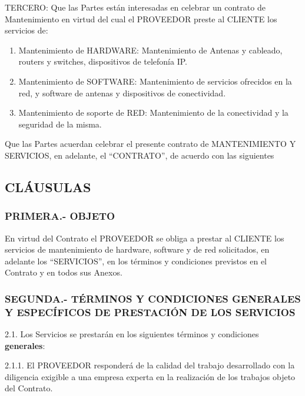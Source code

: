 \documentclass['12pt',spanish,a4paper,]{article}
\begin{document}
TERCERO: Que las Partes están interesadas en celebrar un contrato de
Mantenimiento en virtud del cual el PROVEEDOR preste al CLIENTE los
servicios de:

\begin{enumerate}
\def\labelenumi{\alph{enumi})}
\itemsep1pt\parskip0pt
\item
  Mantenimiento de HARDWARE: Mantenimiento de Antenas y cableado,
  routers y switches, dispositivos de telefonía IP.
\item
  Mantenimiento de SOFTWARE: Mantenimiento de servicios ofrecidos en la
  red, y software de antenas y dispositivos de conectividad.
\item
  Mantenimiento de soporte de RED: Mantenimiento de la conectividad y la
  seguridad de la misma.
\end{enumerate}

Que las Partes acuerdan celebrar el presente contrato de MANTENIMIENTO Y
SERVICIOS, en adelante, el ``CONTRATO'', de acuerdo con las siguientes

\subsection{CLÁUSULAS}\label{cluxe1usulas}

\subsubsection{PRIMERA.- OBJETO}\label{primera.--objeto}

En virtud del Contrato el PROVEEDOR se obliga a prestar al CLIENTE los
servicios de mantenimiento de hardware, software y de red solicitados,
en adelante los ``SERVICIOS'', en los términos y condiciones previstos
en el Contrato y en todos sus Anexos.

\subsubsection{SEGUNDA.- TÉRMINOS Y CONDICIONES GENERALES Y ESPECÍFICOS
DE PRESTACIÓN DE LOS
SERVICIOS}\label{segunda.--tuxe9rminos-y-condiciones-generales-y-especuxedficos-de-prestaciuxf3n-de-los-servicios}

2.1. Los Servicios se prestarán en los siguientes términos y condiciones
\textbf{generales}:

2.1.1. El PROVEEDOR responderá de la calidad del trabajo desarrollado
con la diligencia exigible a una empresa experta en la realización de
los trabajos objeto del Contrato.
\end{document}
